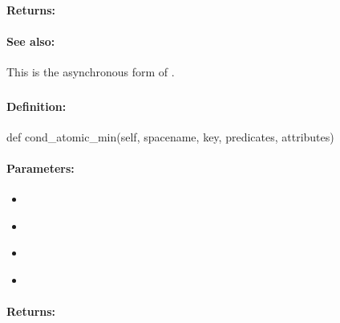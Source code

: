 \paragraph{Returns:}


\paragraph{See also:}  This is the asynchronous form of .

\pagebreak
\subsubsection{}
\label{api:python:cond_atomic_min}


\paragraph{Definition:}
\begin{pythoncode}
def cond_atomic_min(self, spacename, key, predicates, attributes)
\end{pythoncode}

\paragraph{Parameters:}
\begin{itemize}[noitemsep]
\item {}\\

\item {}\\

\item {}\\

\item {}\\

\end{itemize}

\paragraph{Returns:}


